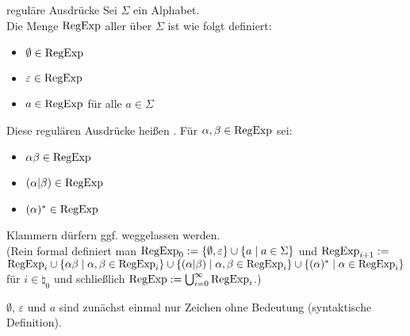 \begin{Def}{reguläre Ausdrücke}
    Sei $\Sigma$ ein Alphabet.\\
    Die Menge $\text{RegExp}$ aller  über $\Sigma$ ist
    wie folgt definiert:
    \begin{itemize}
        \item
        $\emptyset \in \text{RegExp}$
        
        \item
        $\varepsilon \in \text{RegExp}$
        
        \item
        $a \in \text{RegExp}$ für alle $a \in \Sigma$
    \end{itemize}
    Diese regulären Ausdrücke heißen .
    Für $\alpha, \beta \in \text{RegExp}$ sei:
    \begin{itemize}
        \item
        $\alpha\beta \in \text{RegExp}$
        
        \item
        $(\alpha|\beta) \in \text{RegExp}$
        
        \item
        $(\alpha)^\ast \in \text{RegExp}$
    \end{itemize}
    Klammern dürfern ggf. weggelassen werden.\\
    (Rein formal definiert man
    $\text{RegExp}_0 := \{\emptyset, \varepsilon\} \cup \{a \;|\; a \in \Sigma\}$
    und $\text{RegExp}_{i+1} :=$\\
    $\text{RegExp}_i \cup
    \{\alpha\beta \;|\; \alpha, \beta \in \text{RegExp}_i\} \cup
    \{(\alpha|\beta) \;|\; \alpha, \beta \in \text{RegExp}_i\} \cup
    \{(\alpha)^\ast \;|\; \alpha \in \text{RegExp}_i\}$
    für $i \in \natural_0$ und schließlich
    $\text{RegExp} := \bigcup_{i=0}^\infty \text{RegExp}_i$.)
    
    $\emptyset$, $\varepsilon$ und $a$ sind zunächst einmal nur Zeichen
    ohne Bedeutung (syntaktische Definition).
\end{Def}

\linie

